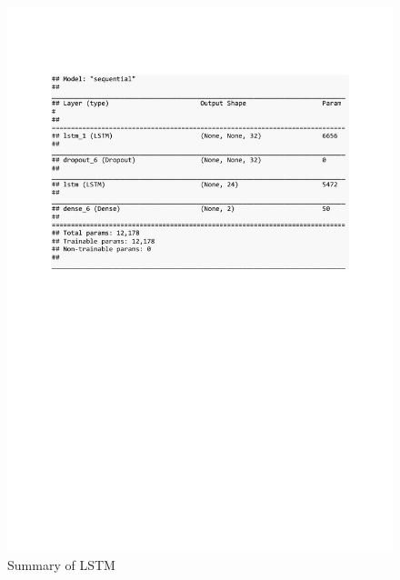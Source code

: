 \begin{figure}[h]
	\centering
	\includegraphics[scale=0.5]{Figures/summary_LSTM_GHL}
	\decoRule
	\caption[Experiment 3: Summary of LSTM for unsupervised learning]{Summary of LSTM \parencite{own}}
	\label{fig:summary_LSTM_GHL}
\end{figure}